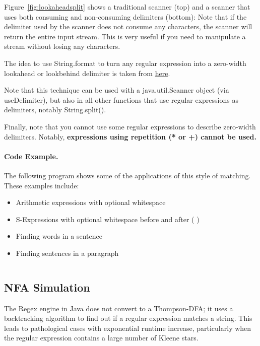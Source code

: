 Figure~\ref{fig:lookaheadsplit} shows a traditional scanner (top) and a scanner that
uses both consuming and non-consuming delimiters (bottom): Note that
if the delimiter used by the scanner does not consume any characters,
the scanner will return the entire input stream. This is very useful if
you need to manipulate a stream without losing any characters.

The idea to use String.format to turn any regular expression into a 
zero-width lookahead or lookbehind delimiter is taken from \href{http://stackoverflow.com/questions/2206378/how-to-split-a-string-but-also-keep-the-delimiters}{here}.

Note that this technique can be used with a java.util.Scanner object
(via useDelimiter), but also in all other functions that use regular
expressions as delimiters, notably String.split().

Finally, note that you cannot use some regular expressions to describe
zero-width delimiters. Notably, \textbf{expressions using repetition (* or +)
cannot be used.}

\paragraph{Code Example.}
The following program shows some of the applications of
this style of matching.  These examples include:
\begin{itemize}
\item Arithmetic expressions with optional whitespace
\item S-Expressions with optional whitespace before and after ( )
\item Finding words in a sentence
\item Finding sentences in a paragraph
\end{itemize}

\inputminted[fontsize=\footnotesize,linenos=true]{java}{code/Lookaround.java}

\subsection{NFA Simulation}

The Regex engine in Java does not convert to a Thompson-DFA; it uses a backtracking algorithm
to find out if a regular expression matches a string.  This leads to pathological cases with
exponential runtime increase, particularly when the regular expression contains a large number
of Kleene stars.

